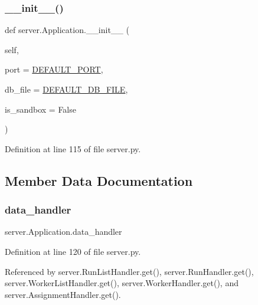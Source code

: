 \subsubsection{\texorpdfstring{\+\_\+\+\_\+init\+\_\+\+\_\+()}{\_\_init\_\_()}}
{\footnotesize\ttfamily def server.\+Application.\+\_\+\+\_\+init\+\_\+\+\_\+ (\begin{DoxyParamCaption}\item[{}]{self,  }\item[{}]{port = {\ttfamily \hyperlink{namespaceserver_a799b32fdd2321df0f6d93809c1aca14a}{D\+E\+F\+A\+U\+L\+T\+\_\+\+P\+O\+RT}},  }\item[{}]{db\+\_\+file = {\ttfamily \hyperlink{namespaceserver_a4d969e2880bb5b39591808aa7992ba7f}{D\+E\+F\+A\+U\+L\+T\+\_\+\+D\+B\+\_\+\+F\+I\+LE}},  }\item[{}]{is\+\_\+sandbox = {\ttfamily False} }\end{DoxyParamCaption})}



Definition at line 115 of file server.\+py.



\subsection{Member Data Documentation}
\mbox{\label{classserver_1_1Application_ab97842caa30d7062d6c5efadf6cff0e7}} 
\subsubsection{\texorpdfstring{data\+\_\+handler}{data\_handler}}
{\footnotesize\ttfamily server.\+Application.\+data\+\_\+handler}



Definition at line 120 of file server.\+py.



Referenced by server.\+Run\+List\+Handler.\+get(), server.\+Run\+Handler.\+get(), server.\+Worker\+List\+Handler.\+get(), server.\+Worker\+Handler.\+get(), and server.\+Assignment\+Handler.\+get().

\mbox{\label{classserver_1_1Application_a7e875665524813ff1d8d524026396584}} 
